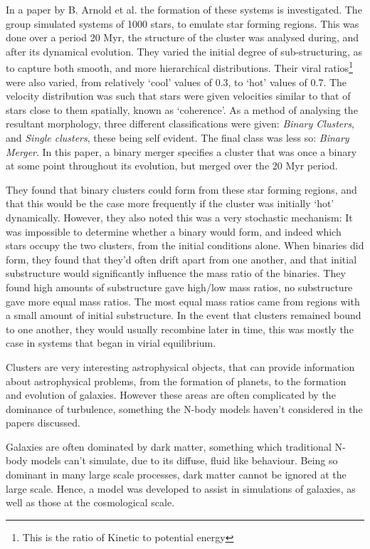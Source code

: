 \documentclass[a4paper,10pt]{article}
\begin{document}
In a paper by B. Arnold et al. the formation of these systems is investigated\cite{ClusterBinary}. The group simulated systems of 1000 stars, to emulate star forming regions. This was done over a period 20 Myr, the structure of the cluster was analysed during, and after its dynamical evolution. They varied the initial degree of sub-structuring, as to capture both smooth, and more hierarchical distributions. Their viral ratios\footnote{This is the ratio of Kinetic to potential energy} were also varied, from relatively `cool' values of 0.3, to `hot' values of 0.7. The velocity distribution was such that stars were given velocities similar to that of stars close to them spatially, known as `coherence'. As a method of analysing the resultant morphology, three different classifications were given: \textit{Binary Clusters}, and \textit{Single clusters}, these being self evident. The final class was less so: \textit{Binary Merger}. In this paper, a binary merger specifies a cluster that was once a binary at some point throughout its evolution, but merged over the 20 Myr period.

They found that binary clusters could form from these star forming regions, and that this would be the case more frequently if the cluster was initially `hot' dynamically. However, they also noted this was a very stochastic mechanism: It was impossible to determine whether a binary would form, and indeed which stars occupy the two clusters, from the initial conditions alone. When binaries did form, they found that they'd often drift apart from one another, and that initial substructure would significantly influence the mass ratio of the binaries. They found high amounts of substructure gave high/low mass ratios, no substructure gave more equal mass ratios. The most equal mass ratios came from regions with a small amount of initial substructure. In the event that clusters remained bound to one another, they would usually recombine later in time, this was mostly the case in systems that began in virial equilibrium.

Clusters are very interesting astrophysical objects, that can provide information about astrophysical problems, from the formation of planets, to the formation and evolution of galaxies. However these areas are often complicated by the dominance of turbulence, something the N-body models haven't considered in the papers discussed.

Galaxies are often dominated by dark matter, something which traditional N-body models can't simulate, due to its diffuse, fluid like behaviour. Being so dominant in many large scale processes, dark matter cannot be ignored at the large scale. Hence, a model was developed to assist in simulations of galaxies, as well as those at the cosmological scale. 
\end{document}
